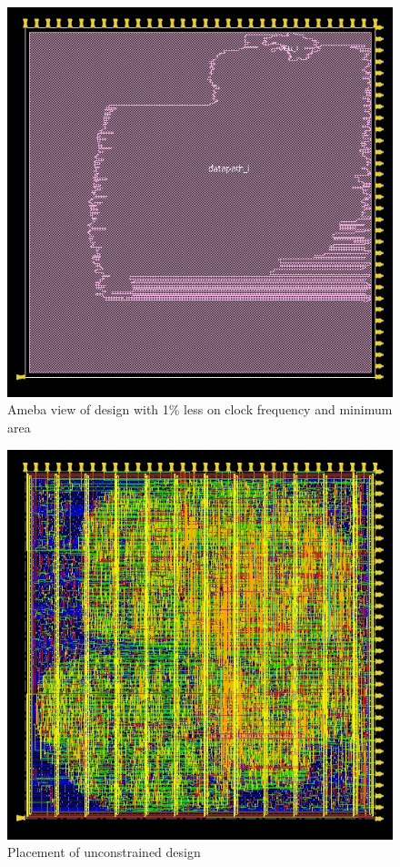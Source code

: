 \begin{figure}[!htbp]
\centering
\captionsetup{justification=centering}
\includegraphics[scale=0.5,angle=0]{../project/physical_design/images_1_minarea/DLX_IR_SIZE32_PC_SIZE32_1_minarea_ameba_prerouting.jpg}
\caption{Ameba view of design with 1\% less on clock frequency and minimum area}
\label{fig:ameba1minarea}
\end{figure}


\begin{figure}[!htbp]
\centering
\captionsetup{justification=centering}
\includegraphics[scale=0.5,angle=0]{../project/physical_design/images_nopt/DLX_IR_SIZE32_PC_SIZE32_nopt_place_prerouting.jpg}
\caption{Placement of unconstrained design}
\label{fig:placno}
\end{figure}





